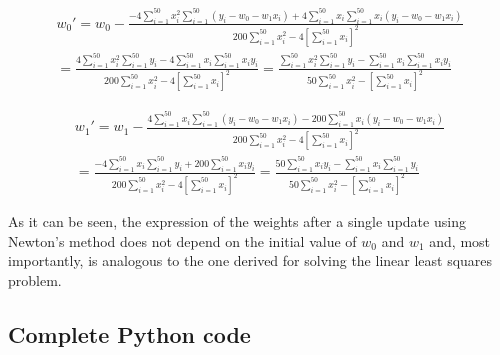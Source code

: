 \documentclass[letterpaper,headings=standardclasses]{scrartcl}
\begin{document}
\begin{multline*}
w_0' = w_0 - \frac{-4 \sum_{i = 1}^{50} x_i^2 \sum_{i = 1}^{50} (y_i - w_0 - w_1 x_i) + 4 \sum_{i = 1}^{50} x_i \sum_{i = 1}^{50} x_i(y_i - w_0 - w_1 x_i)}{200 \sum_{i = 1}^{50} x_i^2 - 4 \left[ \sum_{i = 1}^{50} x_i \right]^2} \\
= \frac{4 \sum_{i = 1}^{50} x_i^2 \sum_{i = 1}^{50} y_i - 4 \sum_{i = 1}^{50} x_i \sum_{i = 1}^{50} x_i y_i}{200 \sum_{i = 1}^{50} x_i^2 - 4 \left[ \sum_{i = 1}^{50} x_i \right]^2} = \frac{\sum_{i = 1}^{50} x_i^2 \sum_{i = 1}^{50} y_i - \sum_{i = 1}^{50} x_i \sum_{i = 1}^{50} x_i y_i}{50 \sum_{i = 1}^{50} x_i^2 - \left[ \sum_{i = 1}^{50} x_i \right]^2}
\end{multline*}

\begin{multline*}
w_1' = w_1 - \frac{4 \sum_{i = 1}^{50} x_i \sum_{i = 1}^{50} (y_i - w_0 - w_1 x_i) - 200 \sum_{i = 1}^{50} x_i(y_i - w_0 - w_1 x_i)}{200 \sum_{i = 1}^{50} x_i^2 - 4 \left[ \sum_{i = 1}^{50} x_i \right]^2} \\
= \frac{-4 \sum_{i = 1}^{50} x_i \sum_{i = 1}^{50} y_i + 200 \sum_{i = 1}^{50} x_i y_i}{200 \sum_{i = 1}^{50} x_i^2 - 4 \left[ \sum_{i = 1}^{50} x_i \right]^2} = \frac{50 \sum_{i = 1}^{50} x_i y_i - \sum_{i = 1}^{50} x_i \sum_{i = 1}^{50} y_i}{50 \sum_{i = 1}^{50} x_i^2 - \left[ \sum_{i = 1}^{50} x_i \right]^2}
\end{multline*}

As it can be seen, the expression of the weights after a single update using Newton's method does not depend on the initial value of $w_0$ and $w_1$ and, most importantly, is analogous to the one derived for solving the linear least squares problem.

\subsection{Complete Python code}


\end{document}
